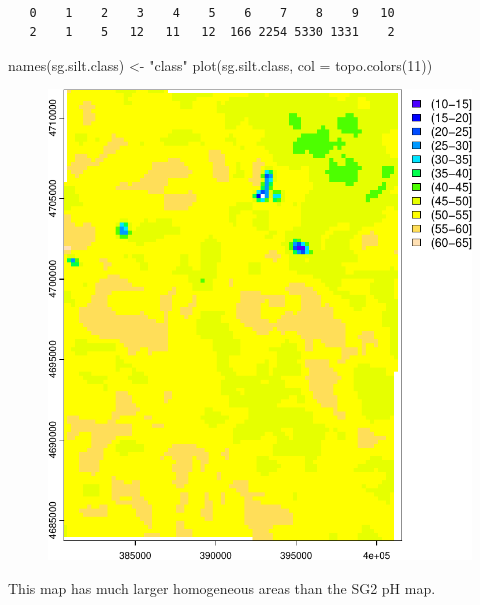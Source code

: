 \documentclass[
  letterpaper,
  DIV=11,
  numbers=noendperiod]{scrartcl}
\newenvironment{Shaded}{\begin{snugshade}}{\end{snugshade}}
\newcommand{\AttributeTok}[1]{\textcolor[rgb]{0.40,0.45,0.13}{#1}}
\newcommand{\DecValTok}[1]{\textcolor[rgb]{0.68,0.00,0.00}{#1}}
\newcommand{\FunctionTok}[1]{\textcolor[rgb]{0.28,0.35,0.67}{#1}}
\newcommand{\NormalTok}[1]{\textcolor[rgb]{0.00,0.23,0.31}{#1}}
\newcommand{\OtherTok}[1]{\textcolor[rgb]{0.00,0.23,0.31}{#1}}
\newcommand{\StringTok}[1]{\textcolor[rgb]{0.13,0.47,0.30}{#1}}
\begin{document}
\begin{verbatim}

   0    1    2    3    4    5    6    7    8    9   10 
   2    1    5   12   11   12  166 2254 5330 1331    2 
\end{verbatim}

\begin{Shaded}
\begin{Highlighting}[]
\FunctionTok{names}\NormalTok{(sg.silt.class) }\OtherTok{\textless{}{-}} \StringTok{"class"}
\FunctionTok{plot}\NormalTok{(sg.silt.class, }\AttributeTok{col =} \FunctionTok{topo.colors}\NormalTok{(}\DecValTok{11}\NormalTok{))}
\end{Highlighting}
\end{Shaded}

\begin{figure}[H]

{\centering \includegraphics{PatternAnalysisWorkshopTutorial_files/figure-pdf/silt-map-1.pdf}

}

\end{figure}

This map has much larger homogeneous areas than the SG2 pH map.
\end{document}
